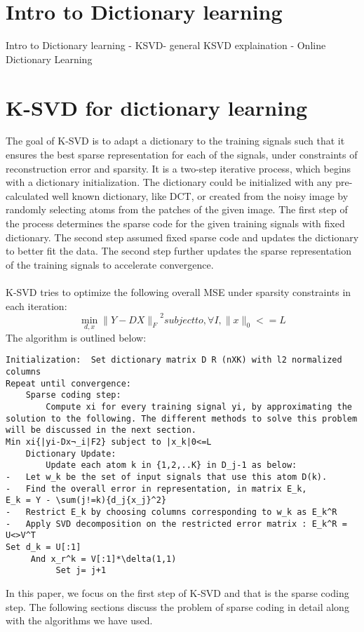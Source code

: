\documentclass{article} %
\begin{document}
\section{Intro to Dictionary learning}
Intro to Dictionary learning
  -	KSVD-  general KSVD explaination
  -	Online Dictionary Learning

\section{K-SVD for dictionary learning}

The goal of K-SVD is to adapt a dictionary to the training signals such that it ensures the best sparse representation for each of the signals, under constraints of reconstruction error and sparsity. It is a two-step iterative process, which begins with a dictionary initialization.  The dictionary could be initialized with any pre-calculated well known dictionary, like DCT, or created from the noisy image by randomly selecting atoms from the patches of the given image. 
The first step of the process determines the sparse code for the given training signals with fixed dictionary. The second step assumed fixed sparse code and updates the dictionary to better fit the data. The second step further updates the sparse representation of the training signals to accelerate convergence. \\ \\
K-SVD tries to optimize the following overall MSE under sparsity constraints in each iteration:\\
\[ \min_{d,x}{\|Y-DX\|_F}^2 subject to, \forall I, \|x\|_0<=L\]
The algorithm is outlined below:\\
\begin{verbatim}
Initialization:  Set dictionary matrix D R (nXK) with l2 normalized columns
Repeat until convergence:
	Sparse coding step:
		Compute xi for every training signal yi, by approximating the solution to the following. The different methods to solve this problem will be discussed in the next section.
Min xi{|yi-Dx¬_i|F2} subject to |x_k|0<=L
	Dictionary Update:
		Update each atom k in {1,2,..K} in D_j-1 as below:
-	Let w_k be the set of input signals that use this atom D(k).
-	Find the overall error in representation, in matrix E_k, 
E_k = Y - \sum(j!=k){d_j{x_j}^2}
-	Restrict E_k by choosing columns corresponding to w_k as E_k^R
-	Apply SVD decomposition on the restricted error matrix : E_k^R = U<>V^T
Set d_k = U[:1]
     And x_r^k = V[:1]*\delta(1,1)
          Set j= j+1

\end{verbatim}
In this paper, we focus on the first step of K-SVD and that is the sparse coding step. The following sections discuss the problem of sparse coding in detail along with the algorithms we have used.
\end{document}
